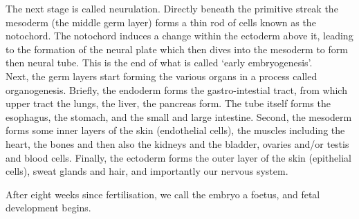 The next stage is called neurulation.
Directly beneath the primitive streak the mesoderm (the middle germ layer) forms a thin rod of cells known as the notochord.
The notochord induces a change within the ectoderm above it, leading to the formation of the neural plate which then dives into the mesoderm to form then neural tube.
This is the end of what is called `early embryogenesis'.\\

Next, the germ layers start forming the various organs in a process called organogenesis.
Briefly, the endoderm forms the gastro-intestial tract, from which upper tract the lungs, the liver, the pancreas form. 
The tube itself forms the esophagus, the stomach, and the small and large intestine.
Second, the mesoderm forms some inner layers of the skin (endothelial cells), the muscles including the heart, the bones and then also the kidneys and the bladder, ovaries and/or testis and blood cells.
Finally, the ectoderm forms the outer layer of the skin (epithelial cells), sweat glands and hair, and importantly our nervous system.

After eight weeks since fertilisation, we call the embryo a foetus, and fetal development begins.








\newpage


